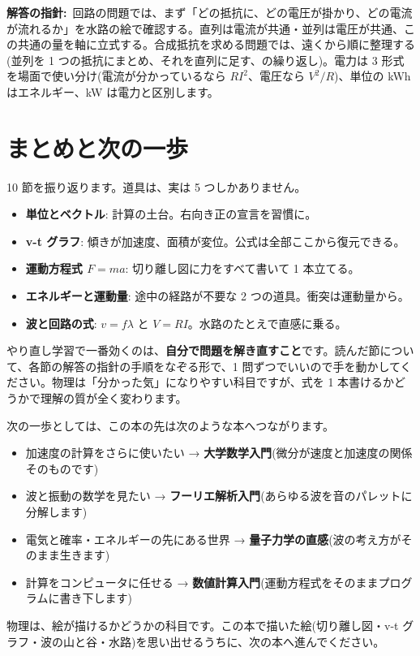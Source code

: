 \documentclass{article}
\begin{document}
\textbf{解答の指針:}\ 回路の問題では、まず「どの抵抗に、どの電圧が掛かり、どの電流が流れるか」を水路の絵で確認する。直列は電流が共通・並列は電圧が共通、この共通の量を軸に立式する。合成抵抗を求める問題では、遠くから順に整理する(並列を 1 つの抵抗にまとめ、それを直列に足す、の繰り返し)。電力は 3 形式を場面で使い分け(電流が分かっているなら \( RI^{2} \)、電圧なら \( V^{2}/R \))、単位の kWh はエネルギー、kW は電力と区別します。

\section{まとめと次の一歩}

10 節を振り返ります。道具は、実は 5 つしかありません。

\begin{itemize}
\item \textbf{単位とベクトル}: 計算の土台。右向き正の宣言を習慣に。
\item \textbf{v-t グラフ}: 傾きが加速度、面積が変位。公式は全部ここから復元できる。
\item \textbf{運動方程式 \( F = ma \)}: 切り離し図に力をすべて書いて 1 本立てる。
\item \textbf{エネルギーと運動量}: 途中の経路が不要な 2 つの道具。衝突は運動量から。
\item \textbf{波と回路の式}: \( v = f\lambda \) と \( V = RI \)。水路のたとえで直感に乗る。
\end{itemize}

やり直し学習で一番効くのは、\textbf{自分で問題を解き直すこと}です。読んだ節について、各節の解答の指針の手順をなぞる形で、1 問ずつでいいので手を動かしてください。物理は「分かった気」になりやすい科目ですが、式を 1 本書けるかどうかで理解の質が全く変わります。

次の一歩としては、この本の先は次のような本へつながります。

\begin{itemize}
\item 加速度の計算をさらに使いたい → \textbf{大学数学入門}(微分が速度と加速度の関係そのものです)
\item 波と振動の数学を見たい → \textbf{フーリエ解析入門}(あらゆる波を音のパレットに分解します)
\item 電気と確率・エネルギーの先にある世界 → \textbf{量子力学の直感}(波の考え方がそのまま生きます)
\item 計算をコンピュータに任せる → \textbf{数値計算入門}(運動方程式をそのままプログラムに書き下します)
\end{itemize}

物理は、絵が描けるかどうかの科目です。この本で描いた絵(切り離し図・v-t グラフ・波の山と谷・水路)を思い出せるうちに、次の本へ進んでください。
\end{document}
